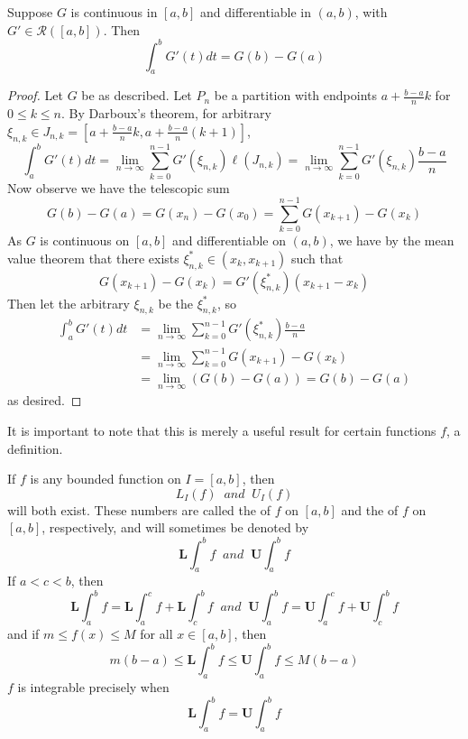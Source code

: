 \begin{theorem}\label{thm:FTC2}
    Suppose $G$ is continuous in $[a,b]$ and differentiable in $(a,b)$, with $G' \in \mathcal{R}([a,b])$. Then $$\int_a^bG'(t)dt = G(b)-G(a)$$
\end{theorem}
\begin{proof}
    Let $G$ be as described. Let $P_n$ be a partition with endpoints $a + \frac{b-a}{n}k$ for $0 \leq k \leq n$. By Darboux's theorem, for arbitrary $\xi_{n,k} \in J_{n,k} = \left[a+\frac{b-a}{n}k,a+\frac{b-a}{n}(k+1)\right]$, \begin{equation*}
        \int_a^bG'(t)dt = \lim\limits_{n\rightarrow \infty}\sum_{k=0}^{n-1}G'(\xi_{n,k})\ell(J_{n,k}) = \lim\limits_{n\rightarrow \infty}\sum_{k=0}^{n-1}G'(\xi_{n,k})\frac{b-a}{n}
    \end{equation*}
    Now observe we have the telescopic sum $$G(b) - G(a) = G(x_n) - G(x_0) = \sum_{k=0}^{n-1}G(x_{k+1})-G(x_k)$$ As $G$ is continuous on $[a,b]$ and differentiable on $(a,b)$, we have by the mean value theorem that there exists $\xi^*_{n,k} \in (x_k,x_{k+1})$ such that $$G(x_{k+1})-G(x_k) = G'(\xi^*_{n,k})(x_{k+1}-x_k)$$ Then let the arbitrary $\xi_{n,k}$ be the $\xi^*_{n,k}$, so \begin{align*}
        \int_a^bG'(t)dt &= \lim\limits_{n\rightarrow \infty}\sum_{k=0}^{n-1}G'(\xi^*_{n,k})\frac{b-a}{n} \\
        &= \lim\limits_{n\rightarrow \infty}\sum_{k=0}^{n-1}G(x_{k+1})-G(x_k) \\
        &= \lim\limits_{n\rightarrow \infty}(G(b) - G(a)) = G(b) - G(a)
    \end{align*}
    as desired.
\end{proof}


It is important to note that this is merely a useful result for certain functions $f$,  a definition.




If $f$ is any bounded function on $I=[a,b]$, then \begin{equation}
    L_I(f)\;\;and\;\;U_I(f)
\end{equation}
will both exist. These numbers are called the  of $f$ on $[a,b]$ and the  of $f$ on $[a,b]$, respectively, and will sometimes be denoted by \begin{equation}
    \mathbf{L}\int_a^bf\;\;and\;\;\mathbf{U}\int_a^bf
\end{equation}
If $a < c < b$, then \begin{equation}
    \mathbf{L}\int_a^bf = \mathbf{L}\int_a^cf + \mathbf{L}\int_c^bf\;\;and\;\;\mathbf{U}\int_a^bf = \mathbf{U}\int_a^cf + \mathbf{U}\int_c^bf
\end{equation}
and if $m \leq f(x) \leq M$ for all $x \in [a,b]$, then \begin{equation}
    m(b-a)\leq \mathbf{L}\int_a^bf \leq \mathbf{U}\int_a^bf\leq M(b-a)
\end{equation}
$f$ is integrable precisely when \begin{equation}
    \mathbf{L}\int_a^bf = \mathbf{U}\int_a^bf
\end{equation}


